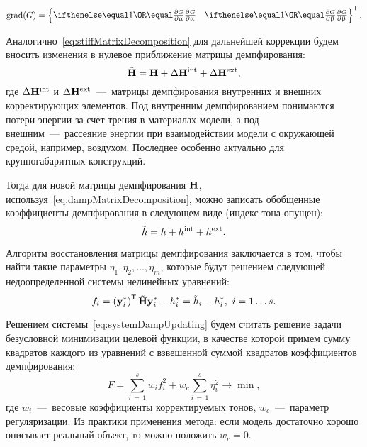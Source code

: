 \begin{equation}
	\mathrm{grad}(G) = 
	\trans{
	\left\{ 
	\begin{matrix}
		\partDer{G}{\alpha}{} & \partDer{G}{\beta}{} 
	\end{matrix} 
	\right\}}.
\end{equation}

Аналогично~\eqref{eq:stiffMatrixDecomposition} для дальнейшей коррекции будем вносить изменения в нулевое приближение матрицы демпфирования:
\begin{equation}
	\tilde{\mathbf{H}} = \mathbf{H} + \Delta \mathbf{H} ^ {\text{int}} + \Delta \mathbf{H} ^ {\text{ext}},
	\label{eq:dampMatrixDecomposition}
\end{equation}
где $ \Delta \mathbf{H} ^ {\text{int}} $ и $ \Delta \mathbf{H} ^ {\text{ext}} $~---~матрицы демпфирования внутренних и внешних корректирующих элементов. Под внутренним демпфированием понимаются потери энергии за счет трения в материалах модели, а под внешним~---~рассеяние энергии при взаимодействии модели с окружающей средой, например, воздухом. Последнее особенно актуально для крупногабаритных конструкций.

Тогда для новой матрицы демпфирования $ \tilde{\mathbf{H}} $, используя~\eqref{eq:dampMatrixDecomposition}, можно записать обобщенные коэффициенты демпфирования в следующем виде (индекс тона опущен):
\begin{equation}
	\tilde{h} = h + h ^ {\text{int}} + h ^ {\text{ext}}.
	\label{eq:updatedGenDamping}
\end{equation}

Алгоритм восстановления матрицы демпфирования заключается в том, чтобы найти такие параметры $ \eta_1, \eta_2, \hdots, \eta_m $, которые будут решением следующей недоопределенной системы нелинейных уравнений:
\begin{equation}
	f_i = \left( \mathbf{y}_i ^ \ast \right) ^ \mathsf{T} \tilde{\mathbf{H}} \mathbf{y}_i ^ \ast - h_i ^ \ast = \tilde{h}_i - h_i ^ \ast, \ i = 1 \hdots s.
	\label{eq:systemDampUpdating}
\end{equation}

Решением системы~\eqref{eq:systemDampUpdating} будем считать решение задачи безусловной минимизации целевой функции, в качестве которой примем сумму квадратов каждого из уравнений с взвешенной суммой квадратов коэффициентов демпфирования:
\begin{equation}
	F = \sum \limits_{i\,=\,1} ^ s w_i f_i ^ 2 + w_c \sum \limits_{i\,=\,1}^s \eta_i ^ 2 \rightarrow \min,
	\label{eq:objFinalDampFunUpdating}
\end{equation}
где $ w_i $~---~весовые коэффициенты корректируемых тонов, $ w_c $~---~параметр регуляризации. Из практики применения метода: если модель достаточно хорошо описывает реальный объект, то можно положить $ w_c = 0 $.

